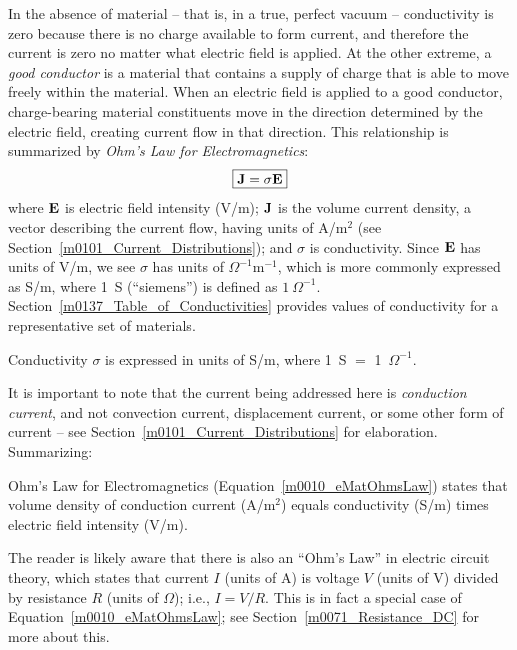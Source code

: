 In the absence of material -- that is, in a true, perfect vacuum -- conductivity is zero because there is no charge available to form current, and therefore the current is zero no matter what electric field is applied.   
At the other extreme, a \emph{good conductor} 
is a material that contains a supply of charge that is able to move freely within the material.  
When an electric field is applied to a good conductor, charge-bearing material constituents move in the direction determined by the electric field, creating current flow in that direction.  
This relationship is summarized by \emph{Ohm's Law for Electromagnetics}:
%
\begin{equation}
\boxed{
{\bf J} = \sigma {\bf E}
}
\label{m0010_eMatOhmsLaw}
\end{equation}
%
where 
${\bf E}$ is electric field intensity (V/m);
${\bf J}$ is the volume current density, a vector describing the current flow, having units of A/m$^2$ (see Section~\ref{m0101_Current_Distributions}); and
$\sigma$ is conductivity.
Since ${\bf E}$ has units of V/m, we see $\sigma$ has units of $\Omega^{-1}\mbox{m}^{-1}$, which is more commonly expressed as S/m, where 1~S (``siemens'') is defined as $1~\Omega^{-1}$.  
Section~\ref{m0137_Table_of_Conductivities} provides values of conductivity for a representative set of materials. 
%
\begin{mdframed}[backgroundcolor=yellow!20,nobreak=true] 
Conductivity $\sigma$ is expressed in units of S/m, where 1~S $=$ 1~$\Omega^{-1}$.  
\end{mdframed}
%
It is important to note that the current being addressed here is \emph{conduction current}, and not convection current, displacement current, or some other form of current -- see Section~\ref{m0101_Current_Distributions} for elaboration.  Summarizing:
%
\begin{mdframed}[backgroundcolor=yellow!20,nobreak=true] 
Ohm's Law for Electromagnetics (Equation~\ref{m0010_eMatOhmsLaw}) states that volume density of conduction current (A/m$^2$) equals conductivity (S/m) times electric field intensity (V/m). 
\end{mdframed}

The reader is likely aware that there is also an ``Ohm's Law'' in electric circuit theory, which states that current $I$ (units of A) is voltage $V$ (units of V) divided by resistance $R$ (units of $\Omega$); i.e., $I=V/R$.  This is in fact a special case of Equation~\ref{m0010_eMatOhmsLaw}; see Section~\ref{m0071_Resistance_DC} for more about this. 

